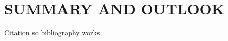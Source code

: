
\chapter{SUMMARY AND OUTLOOK}
\label{Conclusion}

Citation so bibliography works \cite{Chatrchyan:1129810}
